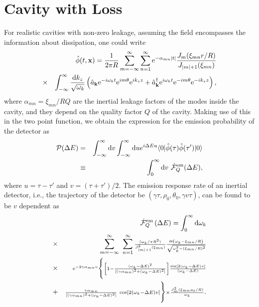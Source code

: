 \documentclass[aps,prl,nofootinbib,preprintnumbers,floatfix,twocolumn,superscriptaddress]{revtex4}
\def\nn{\nonumber}
\def\nn{\nonumber}
\def\l{\left}
\def\r{\right}
\def\d{{\rm d}}
\def\f{\frac}
\def\e{{\rm e}}
\def\k{{\bf k}}
\def\x{{\bf x}}
\begin{document}
\section{Cavity with Loss}
For realistic cavities with non-zero leakage, assuming the field encompasses the information 
about dissipation, one could write 
\begin{eqnarray}
 &&{\hat \phi}(t,\x)=\f{1}{2\pi R}\sum_{m=-\infty}^{\infty}\sum_{n=1}^{\infty} \e^{-\alpha_{mn}|t|} 
 \f{J_{m}(\xi_{mn} r/R)}{J_{|m|+1}(\xi_{mn})} \\ 
 &\times&\int_{-\infty}^{\infty} \f{\d k_z}{\sqrt{\omega_k}}  
 \l({\hat a}_{\k} \e^{-i\omega_k t} \e^{im\theta} \e^{ik_z z}
 +{\hat a}^{\dagger}_{\k} \e^{i\omega_k t} \e^{-im\theta} \e^{-ik_z z}\r), \nn 
\end{eqnarray}
where $\alpha_{mn}= \xi_{mn}/R Q$ are the inertial leakage factors of the modes 
inside the cavity, and they depend on the 
quality factor $Q$ of the cavity. Making use of this in the two point function, 
we obtain the 
expression for the emission probability of the detector as 
\begin{eqnarray}
{\cal P}(\Delta E) &=& \int_{-\infty}^{\infty} \d v \int_{-\infty}^{\infty} \d u  e^{i\Delta E  u} 
 \langle0| {\hat \phi}(\tau){\hat \phi}(\tau')|0\rangle \nn \\ 
 &\equiv&\int_0^{\infty}  \d v~{\dot {\cal F}}^{\text{em}}_Q(\Delta E), 
\end{eqnarray}
where $u=\tau-\tau'$ and $v=(\tau+\tau')/2$. 
The emission response rate of an inertial detector, i.e., the trajectory of the detector be 
$(\gamma \tau,\rho_0,\theta_0,\gamma v \tau)$, 
can be found to be $v$ dependent as 
\begin{eqnarray}
 &&{\dot {\cal F}}^{\text{em}}_{Q}\l(\Delta E\r)=\int_{0}^{\infty} \d \omega_{k} \nn \\ 
 &\times& \sum_{m=-\infty}^{\infty} ~ 
 \sum_{n=1}^{\infty} {\scriptstyle \f{(\omega_k/\pi R^2)}{J^2_{|m|+1}(\xi_{mn})}
 \f{\Theta\l(\omega_k-\xi_{mn}/R\r)}{\sqrt{\omega_k^2-(\xi_{mn}/R)^2}}} \nn \\
 &\times&{\scriptstyle \e^{-2\gamma\alpha_{mn} v} 
 \Biggl\{\l[1-\f{(\omega_k-\Delta E)^2}{[(\gamma\alpha_{mn})^2+(\omega_k-\Delta E)^2]}\r] 
 \f{{\rm sin}[2(\omega_k-\Delta E)v]}{(\omega_k-\Delta E)}} \\ 
 &+&{\scriptstyle \f{\gamma\alpha_{mn}}{[(\gamma\alpha_{mn})^2+(\omega_k-\Delta E)^2]} 
 ~{\rm cos}[2(\omega_k-\Delta E)v]\Biggr\} \times \f{J_{m}^2(\xi_{mn} \rho_0/R)}{\omega_k}}. \nn 
\end{eqnarray}
\end{document}
